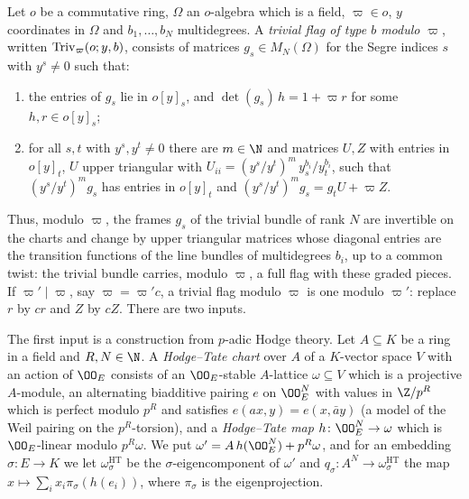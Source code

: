 \begin{definition}\label{pf:towergeo:def-trivmod}
Let $o$ be a commutative ring, $\Omega$ an $o$-algebra which is a field, $\varpi\in o$, $y$ coordinates in
$\Omega$ and $b_1,\dots,b_N$ multidegrees. A \emph{trivial flag of type $b$ modulo $\varpi$}, written
$\mathrm{Triv}_\varpi(o;y,b)$, consists of matrices $g_s\in M_N(\Omega)$ for the Segre indices $s$ with
$y^s\ne0$ such that:
\begin{enumerate}[label=(\roman*)]
\item the entries of $g_s$ lie in $o[y]_s$, and $\det(g_s)\,h=1+\varpi r$ for some $h,r\in o[y]_s$;
\item for all $s,t$ with $y^s,y^t\ne0$ there are $m\in\N$ and matrices $U,Z$ with entries in $o[y]_t$,
  $U$ upper triangular with $U_{ii}=(y^s/y^t)^m\,y_s^{b_i}/y_t^{b_i}$, such that $(y^s/y^t)^mg_s$ has
  entries in $o[y]_t$ and $(y^s/y^t)^mg_s=g_tU+\varpi Z$.
\end{enumerate}
\end{definition}

Thus, modulo $\varpi$, the frames $g_s$ of the trivial bundle of rank $N$ are invertible on the charts and
change by upper triangular matrices whose diagonal entries are the transition functions of the line
bundles of multidegrees $b_i$, up to a common twist: the trivial bundle carries, modulo $\varpi$, a full
flag with these graded pieces. If $\varpi'\mid\varpi$, say $\varpi=\varpi'c$, a trivial flag modulo
$\varpi$ is one modulo $\varpi'$: replace $r$ by $cr$ and $Z$ by $cZ$. There are two inputs.

The first input is a construction from $p$-adic Hodge theory. Let $A\subseteq K$ be a ring in a field and
$R,N\in\N$. A \emph{Hodge--Tate chart} over $A$ of a $K$-vector space $V$ with an action of $\OO_E$ consists
of an $\OO_E$-stable $A$-lattice $\omega\subseteq V$ which is a projective $A$-module, an alternating
biadditive pairing $e$ on $\OO_E^N$ with values in $\Z/p^R$ which is perfect modulo $p^R$ and satisfies
$e(ax,y)=e(x,\bar ay)$ (a model of the Weil pairing on the $p^R$-torsion), and a \emph{Hodge--Tate map}
$h\colon\OO_E^N\to\omega$ which is $\OO_E$-linear modulo $p^R\omega$. We put $\omega'=A\,h(\OO_E^N)+p^R\omega$, and for
an embedding $\sigma\colon E\to K$ we let $\omega^{\mathrm{HT}}_\sigma$ be the $\sigma$-eigencomponent of $\omega'$
and $q_\sigma\colon A^N\to\omega^{\mathrm{HT}}_\sigma$ the map $x\mapsto\sum_ix_i\pi_\sigma(h(e_i))$, where
$\pi_\sigma$ is the eigenprojection.

